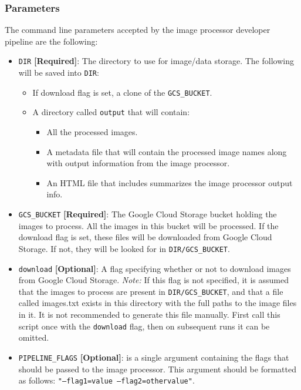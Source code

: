 \documentclass[10pt, onecolumn, draftclsnofoot, letterpaper, compsoc]{IEEEtran}
\begin{document}
\subsubsection{Parameters}

The command line parameters accepted by the image processor developer pipeline are the following:

\begin{itemize}
	\item \texttt{DIR} \textbf{[Required]}: The directory to use for image/data storage. The following will be saved into \texttt{DIR}:

	\begin{itemize}
		\item If download flag is set, a clone of the \texttt{GCS\_BUCKET}.
		\item A directory called \texttt{output} that will contain:

		\begin{itemize}
			\item All the processed images.

			\item A metadata file that will contain the processed image names along with output information from the image processor.

			\item An HTML file that includes summarizes the image processor output info.
		\end{itemize}
	\end{itemize}

	\item \texttt{GCS\_BUCKET} \textbf{[Required]}: The Google Cloud Storage bucket holding the images to process.
	      All the images in this bucket will be processed. If the download flag is set, these files will be downloaded
		  from Google Cloud Storage. If not, they will be looked for in \texttt{DIR/GCS\_BUCKET}.

	\item \texttt{download} \textbf{[Optional]}: A flag specifying whether or not to download images from Google Cloud Storage.
	      \textit{Note:} If this flag is not specified, it is assumed that the images to process are present in \texttt{DIR/GCS\_BUCKET},
		  and that a file called images.txt exists in this directory with the full paths to the image files in it. It is not recommended
		  to generate this file manually. First call this script once with the \texttt{download} flag, then on subsequent
		  runs it can be omitted.

	\item \texttt{PIPELINE\_FLAGS} \textbf{[Optional]}: is a single argument containing the flags that should be passed to the
	      image processor. This argument should be formatted as follows: \texttt{"--flag1=value --flag2=othervalue"}.
\end{itemize}
\end{document}
